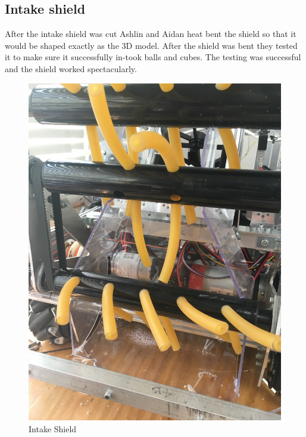 \documentclass{article}
\begin{document}
\subsection{Intake shield}
After the intake shield was cut Ashlin and Aidan heat bent the shield so that it would be shaped exactly as the 3D model. After the shield was bent they tested it to make sure it successfully in-took balls and cubes. The testing was successful and the shield worked  spectacularly.

\begin{figure}
    \centering
    \includegraphics[width=.6\textwidth, angle=270]{10_11-05/images/intake_shield.JPG}
    \caption{Intake Shield}
    \label{fig:Intake Shield}
\end{figure}
\end{document}
